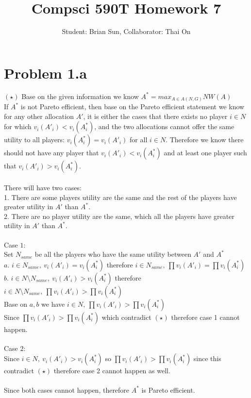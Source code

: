 \documentclass{article}
\title{Compsci 590T Homework 7}
\author{Student: Brian Sun, Collaborator: Thai On}
\date{}
\begin{document}
\maketitle


\section{Problem 1.a}
$(\star)$ Base on the given information we know $A^* = max_{A \in A(N,G)} NW(A)$\\
If $A^*$ is not Pareto efficient, then base on the Pareto efficient statement we know for any other allocation $A'$, it is either the cases that there exists no player $i \in N$ for which $v_i(A'_i) < v_i(A^*_i)$, and the two allocations cannot offer the same utility to all players: $v_i(A^*_i) = v_i(A'_i)$ for all $i \in N$. Therefore we know there should not have any player that $v_i(A'_i) < v_i(A^*_i)$ and at least one player such that $v_i(A'_i) > v_i(A^*_i)$.\\\\
There will have two cases: \\
1. There are some players utility are the same and the rest of the players have greater utility in $A'$ than $A^*$.\\
2. There are no player utility are the same, which all the players have greater utility in $A'$ than $A^*$.\\\\
Case $1:$\\
Set $N_{same}$ be all the players who have the same utility between $A'$ and $A^*$\\
$a.$ $i\in N_{same},\ v_i(A'_i) = v_i(A^*_i)$ therefore $i \in N_{same},\ \prod v_i(A'_i) = \prod v_i(A^*_i)$\\
$b.$ $i \in N \setminus N_{same},\ v_i(A'_i) > v_i(A^*_i)$ therefore $i \in N \setminus N_{same},\  \prod v_i(A'_i) > \prod v_i(A^*_i)$\\
Base on $a,b$ we have $i \in N,\  \prod v_i(A'_i) > \prod v_i(A^*_i)$\\
Since $ \prod v_i(A'_i) > \prod v_i(A^*_i)$ which contradict $(\star)$ therefore case 1 cannot happen.\\\\
Case $2:$\\
Since $i \in N,\ v_i(A'_i) > v_i(A^*_i)$ so $\prod v_i(A'_i) > \prod v_i(A^*_i)$ since this contradict $(\star)$ therefore case 2 cannot happen as well.\\\\
Since both cases cannot happen, therefore $A^*$ is Pareto efficient.
\end{document}
